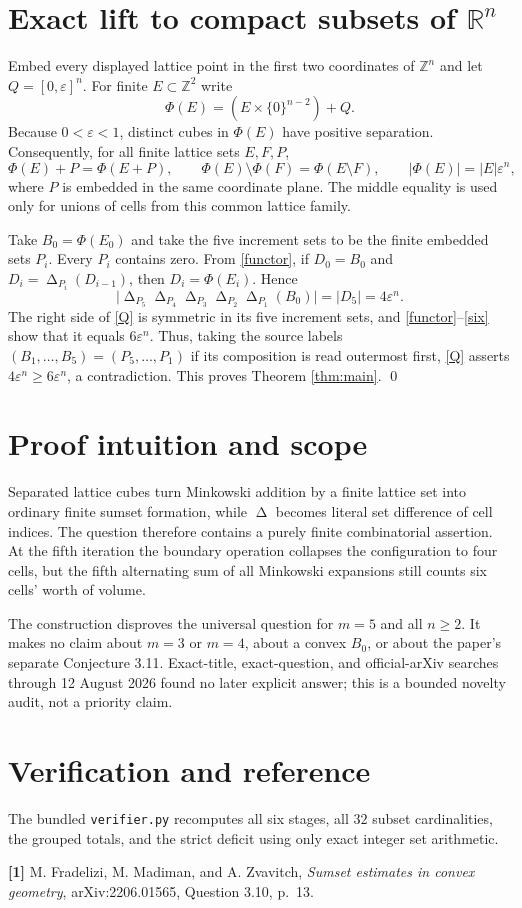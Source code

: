 \documentclass[11pt]{article}
\newcommand{\R}{\mathbb R}
\newcommand{\Z}{\mathbb Z}
\newcommand{\card}[1]{\lvert#1\rvert}
\newcommand{\vol}[1]{\lvert#1\rvert}
\newcommand{\D}{\mathop\Delta}
\begin{document}
\section*{Exact lift to compact subsets of $\R^n$}
Embed every displayed lattice point in the first two coordinates of $\Z^n$
and let $Q=[0,\varepsilon]^n$.  For finite $E\subset\Z^2$ write
\[
 \Phi(E)=(E\times\{0\}^{n-2})+Q.
\]
Because $0<\varepsilon<1$, distinct cubes in $\Phi(E)$ have positive
separation.  Consequently, for all finite lattice sets $E,F,P$,
\begin{equation}\label{functor}
 \Phi(E)+P=\Phi(E+P),\qquad
 \Phi(E)\setminus\Phi(F)=\Phi(E\setminus F),\qquad
 \vol{\Phi(E)}=\card{E}\varepsilon^n,                   \tag{2}
\end{equation}
where $P$ is embedded in the same coordinate plane.  The middle equality is
used only for unions of cells from this common lattice family.

Take $B_0=\Phi(E_0)$ and take the five increment sets to be the finite
embedded sets $P_i$.  Every $P_i$ contains zero.  From \eqref{functor},
if $D_0=B_0$ and $D_i=\D_{P_i}(D_{i-1})$, then
$D_i=\Phi(E_i)$.  Hence
\[
 \vol{\D_{P_5}\D_{P_4}\D_{P_3}\D_{P_2}\D_{P_1}(B_0)}
 =\vol{D_5}=4\varepsilon^n.                              \tag{3}
\]
The right side of \eqref{Q} is symmetric in its five increment sets, and
\eqref{functor}--\eqref{six} show that it equals $6\varepsilon^n$.
Thus, taking the source labels $(B_1,\ldots,B_5)=(P_5,\ldots,P_1)$ if its
composition is read outermost first, \eqref{Q} asserts
$4\varepsilon^n\ge6\varepsilon^n$, a contradiction.  This proves Theorem
\ref{thm:main}. \qed

\section*{Proof intuition and scope}
Separated lattice cubes turn Minkowski addition by a finite lattice set into
ordinary finite sumset formation, while $\D$ becomes literal set difference
of cell indices.  The question therefore contains a purely finite
combinatorial assertion.  At the fifth iteration the boundary operation
collapses the configuration to four cells, but the fifth alternating sum of
all Minkowski expansions still counts six cells' worth of volume.

The construction disproves the universal question for $m=5$ and all
$n\ge2$.  It makes no claim about $m=3$ or $m=4$, about a convex $B_0$, or
about the paper's separate Conjecture 3.11.  Exact-title, exact-question, and
official-arXiv searches through 12 August 2026 found no later explicit answer;
this is a bounded novelty audit, not a priority claim.

\section*{Verification and reference}
The bundled \texttt{verifier.py} recomputes all six stages, all $32$ subset
cardinalities, the grouped totals, and the strict deficit using only exact
integer set arithmetic.

\textbf{[1]} M. Fradelizi, M. Madiman, and A. Zvavitch,
\emph{Sumset estimates in convex geometry}, arXiv:2206.01565,
Question 3.10, p.~13.
\end{document}
